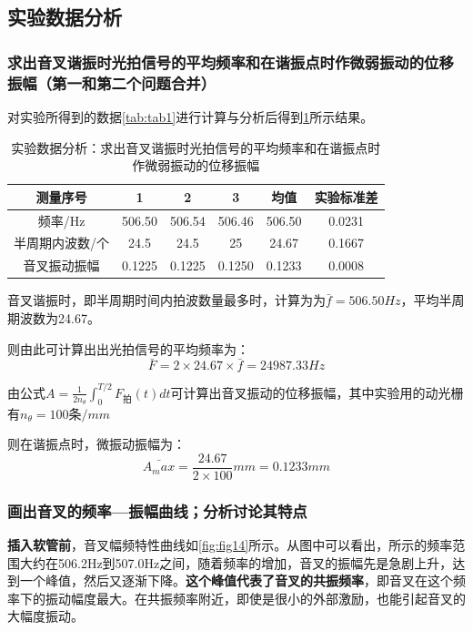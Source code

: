 \documentclass[dvipsnames, svgnames,a4paper,11pt]{article}
\begin{document}
	\subsection{实验数据分析}
	
	\subsubsection{求出音叉谐振时光拍信号的平均频率和在谐振点时作微弱振动的位移振幅（第一和第二个问题合并）}
	
	对实验所得到的数据\cref{tab:tab1}进行计算与分析后得到\cref{tab:tab4}所示结果。
	
	\begin{table}[h]
		\centering
		\caption{实验数据分析：求出音叉谐振时光拍信号的平均频率和在谐振点时作微弱振动的位移振幅}
		\label{tab:tab4}
		\begin{tabular}{|c|c|c|c|c|c|}
			\hline
			测量序号 & 1 & 2 & 3 & 均值 & 实验标准差 \\
			\hline
			频率/Hz & 506.50 & 506.54 & 506.46 & 506.50 & 0.0231 \\
			半周期内波数/个 & 24.5 & 24.5 & 25 & 24.67 & 0.1667 \\
			音叉振动振幅 & 0.1225 & 0.1225 & 0.1250 & 0.1233 & 0.0008 \\
			\hline
		\end{tabular}
	\end{table}	
	
	音叉谐振时，即半周期时间内拍波数量最多时，计算为为$\bar{f}=506.50Hz$，平均半周期波数为24.67。
	
	则由此可计算出出光拍信号的平均频率为：
	\[
	\bar{F}=2\times24.67\times \bar{f}=24987.33Hz
	\]
	
	由公式$ A =\frac{1}{2n_\theta} \int_0^{T/2} F_{拍}(t)  dt $可计算出音叉振动的位移振幅，其中实验用的动光栅有$n_\theta=100条/mm$
	
	则在谐振点时，微振动振幅为：
	\[
	\bar{A_max}=\frac{24.67}{2\times100}mm=0.1233mm	
	\]
	
	\subsubsection{画出音叉的频率—振幅曲线；分析讨论其特点}
	
	\textbf{插入软管前}，音叉幅频特性曲线如\cref{fig:fig14}所示。从图中可以看出，所示的频率范围大约在506.2Hz到507.0Hz之间，随着频率的增加，音叉的振幅先是急剧上升，达到一个峰值，然后又逐渐下降。\textbf{这个峰值代表了音叉的共振频率}，即音叉在这个频率下的振动幅度最大。在共振频率附近，即使是很小的外部激励，也能引起音叉的大幅度振动。
	
\end{document}
